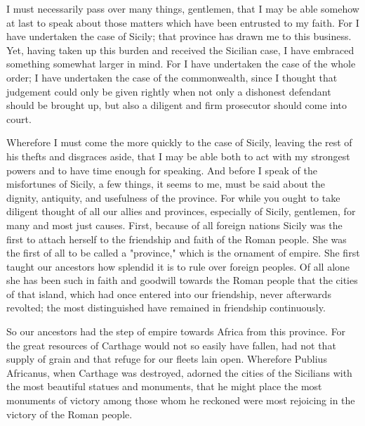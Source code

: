 %

 I must necessarily pass over many things, gentlemen, that I may be able somehow at last to speak about those matters which have been entrusted to my faith. For I have undertaken the case of Sicily; that province has drawn me to this business. Yet, having taken up this burden and received the Sicilian case, I have embraced something somewhat larger in mind. For I have undertaken the case of the whole order; I have undertaken the case of the commonwealth, since I thought that judgement could only be given rightly when not only a dishonest defendant should be brought up, but also a diligent and firm prosecutor should come into court.

 Wherefore I must come the more quickly to the case of Sicily, leaving the rest of his thefts and disgraces aside, that I may be able both to act with my strongest powers and to have time enough for speaking. And before I speak of the misfortunes of Sicily, a few things, it seems to me, must be said about the dignity, antiquity, and usefulness of the province. For while you ought to take diligent thought of all our allies and provinces, especially of Sicily, gentlemen, for many and most just causes. First, because of all foreign nations Sicily was the first to attach herself to the friendship and faith of the Roman people. She was the first of all to be called a "province," which is the ornament of empire. She first taught our ancestors how splendid it is to rule over foreign peoples. Of all alone she has been such in faith and goodwill towards the Roman people that the cities of that island, which had once entered into our friendship, never afterwards revolted; the most distinguished have remained in friendship continuously.

 So our ancestors had the step of empire towards Africa from this province. For the great resources of Carthage would not so easily have fallen, had not that supply of grain and that refuge for our fleets lain open. Wherefore Publius Africanus, when Carthage was destroyed, adorned the cities of the Sicilians with the most beautiful statues and monuments, that he might place the most monuments of victory among those whom he reckoned were most rejoicing in the victory of the Roman people.

